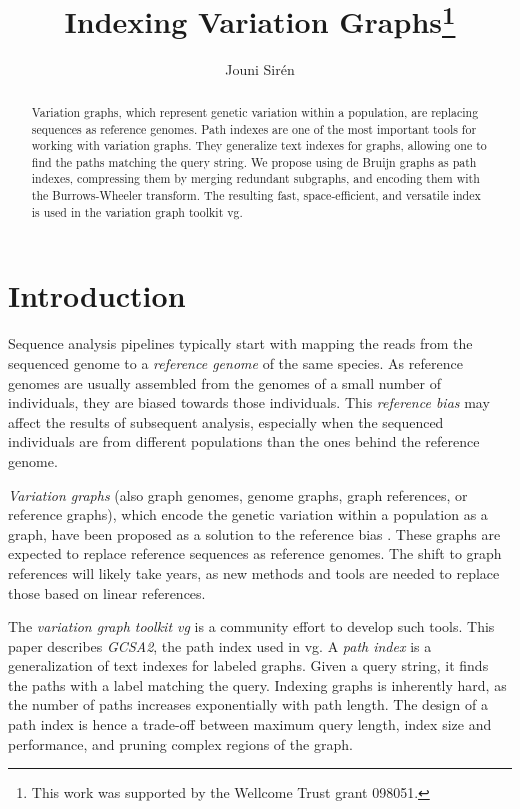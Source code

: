 \documentclass[a4paper,11pt]{llncs}
\title{Indexing Variation Graphs\thanks{This work was supported by the Wellcome Trust grant 098051.}}
\author{Jouni Sirén}
\institute{Wellcome Trust Sanger Institute, UK \\ \email{jouni.siren@iki.fi}}
\begin{document}
\thispagestyle{empty}
\setcounter{page}{0}
\maketitle

\begin{abstract}
Variation graphs, which represent genetic variation within a population, are replacing sequences as reference genomes. Path indexes are one of the most important tools for working with variation graphs. They generalize text indexes for graphs, allowing one to find the paths matching the query string. We propose using de Bruijn graphs as path indexes, compressing them by merging redundant subgraphs, and encoding them with the Burrows-Wheeler transform. The resulting fast, space-efficient, and versatile index is used in the variation graph toolkit vg.
\end{abstract}


\clearpage
\section{Introduction}

Sequence analysis pipelines typically start with mapping the reads from the sequenced genome to a \emph{reference genome} of the same species. As reference genomes are usually assembled from the genomes of a small number of individuals, they are biased towards those individuals. This \emph{reference bias} may affect the results of subsequent analysis, especially when the sequenced individuals are from different populations than the ones behind the reference genome.

\emph{Variation graphs} (also graph genomes, genome graphs, graph references, or reference graphs), which encode the genetic variation within a population as a graph, have been proposed as a solution to the reference bias \cite{Paten2014,Marcus2014,Church2015,Dilthey2015,Marschall2016}. These graphs are expected to replace reference sequences as reference genomes. The shift to graph references will likely take years, as new methods and tools are needed to replace those based on linear references.

The \emph{variation graph toolkit vg} \cite{Garrison2014-2016} is a community effort to develop such tools. This paper describes \emph{GCSA2}, the path index used in vg. A \emph{path index} is a generalization of text indexes for labeled graphs. Given a query string, it finds the paths with a label matching the query. Indexing graphs is inherently hard, as the number of paths increases exponentially with path length. The design of a path index is hence a trade-off between maximum query length, index size and performance, and pruning complex regions of the graph.
\end{document}
